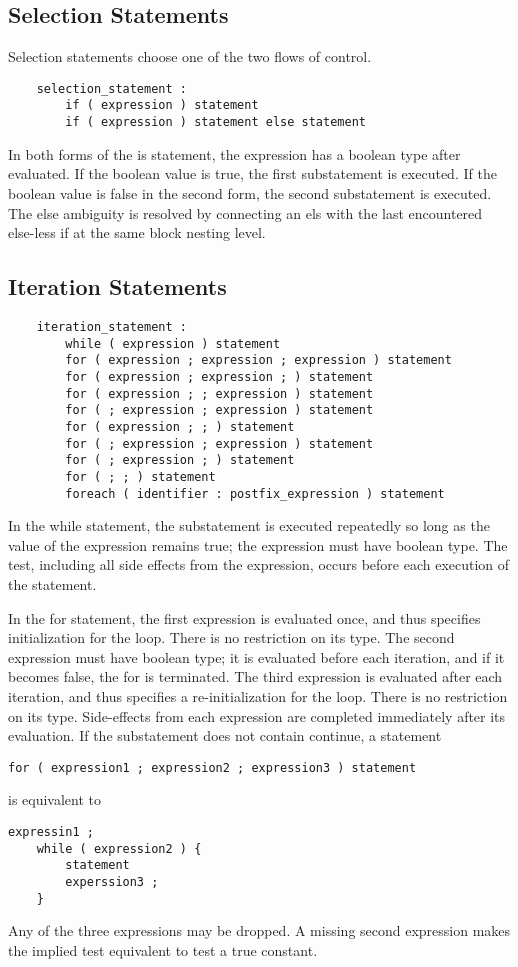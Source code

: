 \documentclass[letterpaper,12pt]{article}
\begin{document}
\subsection{Selection Statements}
Selection statements choose one of the two flows of control.
\begin{lstlisting}
	selection_statement :
		if ( expression ) statement
		if ( expression ) statement else statement
\end{lstlisting}
In both forms of the is statement, the expression has a boolean type after evaluated. If the boolean value is true, the first substatement is executed. If the boolean value is false in the second form, the second substatement is executed. The else ambiguity is resolved by connecting an els with the last encountered else-less if at the same block nesting level.

\subsection{Iteration Statements}\label{sec:loop}
\begin{lstlisting}
	iteration_statement :
		while ( expression ) statement
		for ( expression ; expression ; expression ) statement
		for ( expression ; expression ; ) statement
		for ( expression ; ; expression ) statement
		for ( ; expression ; expression ) statement
		for ( expression ; ; ) statement
		for ( ; expression ; expression ) statement
		for ( ; expression ; ) statement
		for ( ; ; ) statement
		foreach ( identifier : postfix_expression ) statement
\end{lstlisting}
In the while statement, the substatement is executed repeatedly so long as the value of the expression remains true; the expression must have boolean type. The test, including all side effects from the expression, occurs before each execution of the statement. \newline

In the for statement, the first expression is evaluated once, and thus specifies initialization for the loop. There is no restriction on its type. The second expression must have boolean type; it is evaluated before each iteration, and if it becomes false, the for is terminated. The third expression is evaluated after each iteration, and thus specifies a re-initialization for the loop. There is no restriction on its type. Side-effects from each expression are completed immediately after its evaluation. If the substatement does not contain continue, a statement
\begin{lstlisting}[frame=none]
	for ( expression1 ; expression2 ; expression3 ) statement
\end{lstlisting}
is equivalent to
\begin{lstlisting}[frame=none]
	expressin1 ;
	while ( expression2 ) {
		statement
		experssion3 ;
	}
\end{lstlisting}
Any of the three expressions may be dropped. A missing second expression makes the implied test equivalent to test a true constant. \newline
\end{document}
